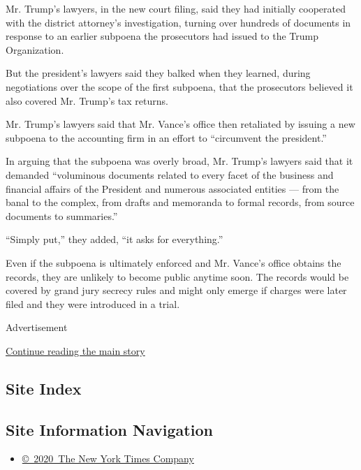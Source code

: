 Mr. Trump's lawyers, in the new court filing, said they had initially
cooperated with the district attorney's investigation, turning over
hundreds of documents in response to an earlier subpoena the prosecutors
had issued to the Trump Organization.

But the president's lawyers said they balked when they learned, during
negotiations over the scope of the first subpoena, that the prosecutors
believed it also covered Mr. Trump's tax returns.

Mr. Trump's lawyers said that Mr. Vance's office then retaliated by
issuing a new subpoena to the accounting firm in an effort to
``circumvent the president.''

In arguing that the subpoena was overly broad, Mr. Trump's lawyers said
that it demanded ``voluminous documents related to every facet of the
business and financial affairs of the President and numerous associated
entities --- from the banal to the complex, from drafts and memoranda to
formal records, from source documents to summaries.''

``Simply put,'' they added, ``it asks for everything.''

Even if the subpoena is ultimately enforced and Mr. Vance's office
obtains the records, they are unlikely to become public anytime soon.
The records would be covered by grand jury secrecy rules and might only
emerge if charges were later filed and they were introduced in a trial.

Advertisement

\protect\hyperlink{after-bottom}{Continue reading the main story}

\hypertarget{site-index}{%
\subsection{Site Index}\label{site-index}}

\hypertarget{site-information-navigation}{%
\subsection{Site Information
Navigation}\label{site-information-navigation}}

\begin{itemize}
\tightlist
\item
  \href{https://help.nytimes.com/hc/en-us/articles/115014792127-Copyright-notice}{©~2020~The
  New York Times Company}
\end{itemize}

